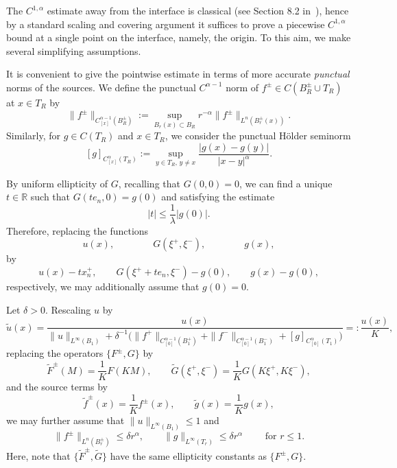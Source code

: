 \documentclass[letter,11pt]{amsart}
\newcommand{\R}{\mathbb{R}}
\theoremstyle{definition}
\numberwithin{equation}{section}
\begin{document}
\medskip

The $C^{1,\alpha}$ estimate away from the interface is classical (see Section 8.2 in~\cite{CC}), hence by a standard scaling and covering argument it suffices to prove a piecewise $C^{1,\alpha}$ bound at a single point on the interface, namely, the origin.
To this aim, we make several simplifying assumptions.

\medskip

It is convenient to give the pointwise estimate in terms of more accurate \emph{punctual} norms of the sources.
We define the punctual $C^{\alpha-1}$ norm of $f^{\pm} \in C(B_R^{\pm} \cup T_R)$ at $x \in T_R$ by
\begin{equation}
\label{point:morrey}
\|f^{\pm}\|_{C_{[x]}^{\alpha-1}(B^{\pm}_R)} := \sup_{B_r(x) \subset B_R} r^{-\alpha} \|f^{\pm}\|_{L^{n}(B^{\pm}_r(x))}.
\end{equation}
Similarly, for $g \in C(T_R)$ and $x \in T_R$, we consider the punctual H\"{o}lder seminorm
\begin{equation}
\label{point:holder}
[g]_{C^{\alpha}_{[x]}(T_R)} := \sup_{y \in T_R, \, y \neq x} \frac{|g(x) - g(y)|}{|x-y|^{\alpha}}.
\end{equation}


\medskip

By uniform ellipticity of $G$, recalling that $G(0, 0) = 0$, we can find a unique $t \in \R$ such that $G(t e_n, 0) = g(0)$ and satisfying the estimate
\[
|t| \leq \frac{1}{\lambda} |g(0)|.
\]
Therefore, replacing the functions
\[
u(x), \qquad\qquad G(\xi^{+}, \xi^{-}), \qquad \qquad g(x),
\]
by
\[
u(x)- t x_n^{+}, \qquad G(\xi^{+} + t e_n, \xi^{-}) - g(0), \qquad g(x) - g(0),
\]
respectively, we may additionally assume that $g(0) = 0$.

\medskip

Let $\delta > 0$.
Rescaling $u$ by 
\[
\widetilde{u}(x) = \frac{u(x)}{\|u\|_{L^{\infty}(B_1)} 
+ \delta^{-1} 
\Big( 
\|f^{+}\|_{C_{[0]}^{\alpha-1}(B_1^{+})} + \|f^{-}\|_{C_{[0]}^{\alpha-1}(B_1^{-})} 
+ [g]_{C_{[0]}^{\alpha}(T_1)}
\Big) 
} =: \frac{u(x)}{K},
\]
replacing the operators $\{F^{\pm}, G\}$ by
\[
\widetilde{F}^{\pm}(M) = \frac{1}{K} F(K M), \qquad \widetilde{G}(\xi^{+}, \xi^{-}) = \frac{1}{K} G(K \xi^{+}, K \xi^{-}),
\]
and the source terms by
\[
\widetilde{f}^{\pm}(x) = \frac{1}{K} f^{\pm}(x), \qquad \widetilde{g}(x) = \frac{1}{K} g(x),
\]
we may further assume that
$\|u\|_{L^{\infty}(B_1)} \leq 1$ and
\[
\|f^{\pm}\|_{L^{n}(B_r^{\pm})} \leq \delta r^{\alpha},
\qquad 
\|g\|_{L^{\infty}(T_{r})} \leq \delta r^{\alpha}
\qquad \text{ for } r \leq 1.
\]
Here, note that $\{\widetilde{F}^{\pm}, \widetilde{G}\}$ have the same ellipticity constants as $\{F^{\pm}, G\}$.
\end{document}
